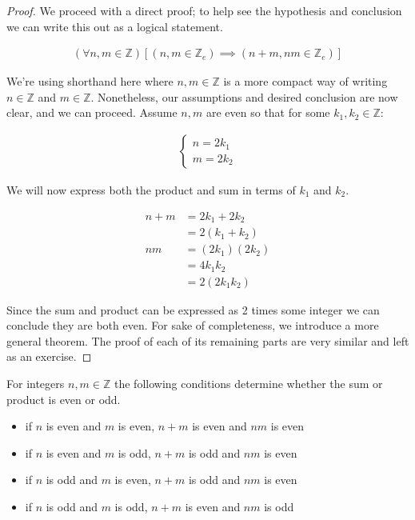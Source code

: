 \documentclass[twoside]{report}
\begin{document}
\begin{proof}
	We proceed with a direct proof; to help see the hypothesis and conclusion we can write this out as a logical statement.
	
	\begin{align*}
		(\forall n, m \in \mathbb{Z})[(n, m \in \mathbb{Z}_e) \implies (n + m, nm \in \mathbb{Z}_e)]
	\end{align*}
	
	We're using shorthand here where $n, m \in \mathbb{Z}$ is a more compact way of writing $n \in \mathbb{Z}$ and $m \in \mathbb{Z}$. Nonetheless, our assumptions and desired conclusion are now clear, and we can proceed. Assume $n, m$ are even so that for some $k_1, k_2 \in \mathbb{Z}$:
	
	\begin{align*}
		\begin{cases}
			n = 2 k_1 \\
			m = 2 k_2
		\end{cases}
	\end{align*} 
	
	We will now express both the product and sum in terms of $k_1$ and $k_2$.
	
	\begin{align*}
		n + m &= 2 k_1 + 2 k_2 \\
		&= 2 (k_1 + k_2) \\
		nm &= (2 k_1)(2 k_2) \\
		&= 4 k_1 k_2 \\
		&= 2 (2 k_1 k_2)
	\end{align*}
	
	Since the sum and product can be expressed as 2 times some integer we can conclude they are both even. For sake of completeness, we introduce a more general theorem. The proof of each of its remaining parts are very similar and left as an exercise.
\end{proof}
\vspace{\baselineskip}

\begin{theorem}
	For integers $n, m \in \mathbb{Z}$ the following conditions determine whether the sum or product is even or odd.
	
	\begin{itemize}
		\item if $n$ is even and $m$ is even, $n + m$ is even and $nm$ is even
		\item if $n$ is even and $m$ is odd, $n + m$ is odd and $nm$ is even
		\item if $n$ is odd and $m$ is even, $n + m$ is odd and $nm$ is even
		\item if $n$ is odd and $m$ is odd, $n + m$ is even and $nm$ is odd
	\end{itemize}
\end{theorem}
\vspace{\baselineskip}
\end{document}
